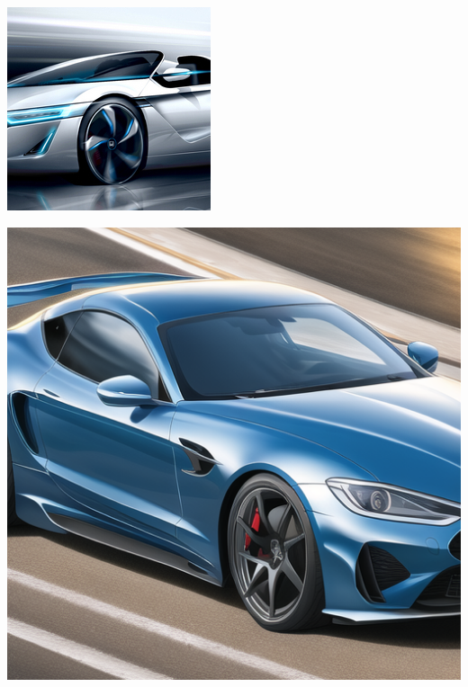 \documentclass[10pt]{article}
\begin{document}
\begin{center}
\begin{minipage}{0.3\textwidth}
\begin{minipage}{.5\textwidth}
        \label{fig:test2}
    \end{minipage}
  \end{minipage}
  \begin{minipage}{0.3\textwidth}
    \centering
      \begin{minipage}{.5\textwidth}
        \centering
        \includegraphics[width=0.9\linewidth]{sports_car1.jpg}
        \label{fig:test1}
      \end{minipage}%
      \begin{minipage}{.5\textwidth}
        \centering
        \includegraphics[width=0.9\linewidth]{sports_car2.jpg}
        \label{fig:test2}
    \end{minipage}
  \end{minipage}
\end{center}
\end{document}
